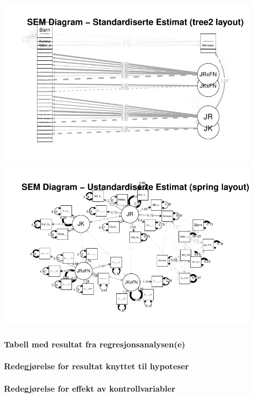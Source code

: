 \documentclass[
  12pt,
  a4paper,
  DIV=11,
  numbers=noendperiod]{scrartcl}
\begin{document}
\includegraphics{kand_SOK2209_Bacheloroppgave_V25_files/figure-pdf/unnamed-chunk-18-1.pdf}

\includegraphics{kand_SOK2209_Bacheloroppgave_V25_files/figure-pdf/unnamed-chunk-18-2.pdf}

\subsubsection{Tabell med resultat fra
regresjonsanalysen(e)}\label{tabell-med-resultat-fra-regresjonsanalysene}

\subsubsection{Redegjørelse for resultat knyttet til
hypoteser}\label{redegjuxf8relse-for-resultat-knyttet-til-hypoteser}

\subsubsection{Redegjørelse for effekt av
kontrollvariabler}\label{redegjuxf8relse-for-effekt-av-kontrollvariabler}
\end{document}
